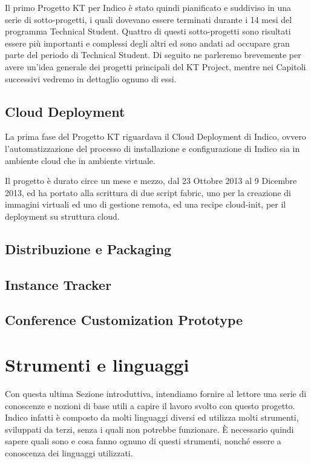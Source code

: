     	Il primo Progetto KT per Indico è stato quindi pianificato e suddiviso in una serie di sotto-progetti, i quali dovevano essere terminati durante i 14 mesi del programma Technical Student. Quattro di questi sotto-progetti sono risultati essere più importanti e complessi degli altri ed sono andati ad occupare gran parte del periodo di Technical Student. Di seguito ne parleremo brevemente per avere un'idea generale dei progetti principali del KT Project, mentre nei Capitoli successivi vedremo in dettaglio ognuno di essi.
    	
    	\subsection{Cloud Deployment} \label{subsec:p;pp;cloud}
    	
        	La prima fase del Progetto KT riguardava il Cloud Deployment di Indico, ovvero l'automatizzazione del processo di installazione e configurazione di Indico sia in ambiente cloud che in ambiente virtuale.
        	
        	Il progetto è durato circe un mese e mezzo, dal 23 Ottobre 2013 al 9 Dicembre 2013, ed ha portato alla scrittura di due script fabric, uno per la creazione di immagini virtuali ed uno di gestione remota, ed una recipe cloud-init, per il deployment su struttura cloud.
    	
    	\subsection{Distribuzione e Packaging} \label{subsec:p;pp:distribuzione}
    	
    	\subsection{Instance Tracker} \label{subsec:p;pp;instance_tracker}
    	
    	\subsection{Conference Customization Prototype} \label{subsec:p;pp;conference_customization_prototype}
    	
    \section{Strumenti e linguaggi} \label{sec:p;strumenti_linguaggi}
    
        Con questa ultima Sezione introduttiva, intendiamo fornire al lettore una serie di conoscenze e nozioni di base utili a capire il lavoro svolto con questo progetto. Indico infatti è composto da molti linguaggi diversi ed utilizza molti strumenti, sviluppati da terzi, senza i quali non potrebbe funzionare. È necessario quindi sapere quali sono e cosa fanno ognuno di questi strumenti, nonché essere a conoscenza dei linguaggi utilizzati.
    
